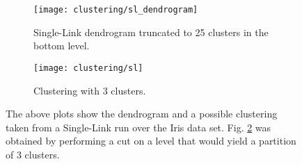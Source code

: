 \begin{figure}[!ht]
    \centering
    \begin{subfigure}[b]{0.45\textwidth}
        \centering
        \texttt{[image: clustering/sl\_dendrogram]}
        \caption{Single-Link dendrogram truncated to 25 clusters in the bottom level.}
        \label{fig:sl dendrogram}
    \end{subfigure}
    \begin{subfigure}[b]{0.45\textwidth}
        \centering
        \texttt{[image: clustering/sl]}
        \caption{Clustering with 3 clusters.}
        \label{fig:sl clustering}
    \end{subfigure}

    \caption{The above plots show the dendrogram and a possible clustering taken from a Single-Link run over the Iris data set. Fig. \ref{fig:sl clustering} was obtained by performing a cut on a level that would yield a partition of 3 clusters.}
    \label{fig:sl plots}
\end{figure}